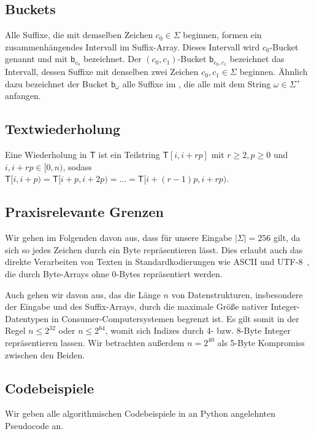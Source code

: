 \subsection{Buckets}
\label{def:bucket}
Alle Suffixe, die mit demselben Zeichen $c_0 \in \Sigma$ beginnen, formen ein zusammenhängendes Intervall im Suffix-Array.
Dieses Intervall wird $c_0$-Bucket genannt und mit $\mathsf b_{c_0}$ bezeichnet.
Der $(c_0,c_1)$-Bucket $\mathsf b_{c_0, c_1}$ bezeichnet das Intervall, dessen Suffixe mit denselben zwei Zeichen $c_0, c_1 \in \Sigma$ beginnen.
Ähnlich dazu bezeichnet der Bucket $\mathsf b_\omega$ alle Suffixe im \sa, die alle mit dem String $\omega \in \Sigma^+$ anfangen.

\subsection{Textwiederholung}
\label{def:repetition}
Eine Wiederholung in $\mathsf{T}$ ist ein Teilstring $\mathsf{T}[i, i + rp]$ mit $ r \geq 2, p \geq 0$ und $i, i + rp \in [0, n)$, sodass $\mathsf{T}[i, i+p) = \mathsf{T}[i + p, i + 2p) = \dots = \mathsf{T}[i + (r-1)p, i + rp)$.

\subsection{Praxisrelevante Grenzen}

Wir gehen im Folgenden davon aus, dass für unsere Eingabe $|\Sigma| = 256$ gilt, da sich so jedes Zeichen durch ein Byte repräsentieren lässt. Dies erlaubt auch das direkte Verarbeiten von Texten in Standardkodierungen wie ASCII und UTF-8~\cite{grundlagen:utf8}, die durch Byte-Arrays ohne 0-Bytes repräsentiert werden.

Auch gehen wir davon aus, das die Länge $n$ von Datenstrukturen, insbesondere der Eingabe und des Suffix-Arrays, durch die maximale Größe nativer Integer-Datentypen in Consumer-Computersystemen begrenzt ist. Es gilt somit in der Regel $n \leq 2^{32}$ oder $n \leq 2^{64}$, womit sich Indizes durch 4- bzw. 8-Byte Integer repräsentieren lassen. Wir betrachten außerdem $n = 2^{40}$ als 5-Byte Kompromiss zwischen den Beiden.

\subsection{Codebeispiele}

Wir geben alle algorithmischen Codebeispiele in an Python angelehnten Pseudocode an.

